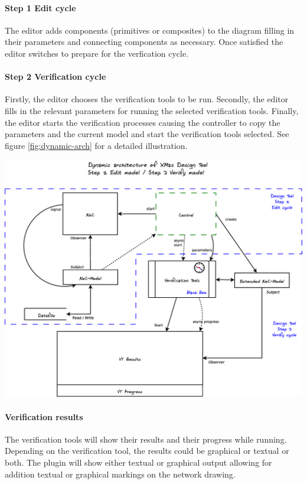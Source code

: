 \paragraph{Step 1 Edit cycle} The editor adds components (primitives or 
composites) to the \Noc diagram filling in their parameters and connecting 
components as necessary. Once satisfied the editor switches to prepare 
for the verfication cycle.

\paragraph{Step 2 Verification cycle} 
Firstly, the editor chooses the verification tools to be run.
Secondly, the editor fills in the relevant parameters for running the selected 
verification tools. Finally, the editor starts the verification processes causing
the controller to copy the parameters and the current \Noc model and start
the verification tools selected. See figure \ref{fig:dynamic-arch} for a 
detailed illustration.

\begin{center}
	\includegraphics[width=.95\linewidth]{../architecture-dynamic}
	\label{fig:dynamic-arch}
\end{center}

\paragraph{Verification results} The verification tools 
will show their results and their progress while running. 
Depending on the verification tool, the results could be
graphical or textual or both. The plugin will show either
textual or graphical output allowing for addition textual 
or graphical markings on the network drawing.

